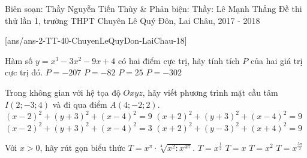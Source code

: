 \begin{name}
{Biên soạn: Thầy Nguyễn Tiến Thùy \& Phản biện: Thầy: Lê Mạnh Thắng}
{Đề thi thử lần 1, trường THPT Chuyên Lê Quý Đôn, Lai Châu, 2017 - 2018}
\end{name}
\setcounter{ex}{0}
[ans/ans-2-TT-40-ChuyenLeQuyDon-LaiChau-18]

\begin{ex}%
Hàm số $y=x^3-3x^2-9x+4$ có hai điểm cực trị, hãy tính tích $P$ của hai giá trị cực trị đó.
\choice
{\True $P=-207$}
{$P=-82$}
{$P=25$}
{$P=-302$}
\end{ex}

\begin{ex}%
Trong không gian với hệ tọa độ $Oxyz$, hãy viết phương trình mặt cầu tâm $I(2;-3;4)$ và đi qua điểm $A(4;-2;2)$.
\choice
{\True $(x-2)^2+(y+3)^2+(x-4)^2=9$}
{$(x+2)^2+(y+3)^2+(x-4)^2=9$}
{$(x-2)^2+(y+3)^2+(x-4)^2=3$}
{$(x+2)^2+(y-3)^2+(x+4)^2=9$}
\end{ex}

\begin{ex}%
Với $x>0$, hãy rút gọn biểu thức $T=x^{\pi}\cdot\sqrt[4]{x^2:x^{4\pi}}$.
\choice
{\True $T=x^{\frac{1}{2}}$}
{$T=x$}
{$T=x^2$}
{$T=x^{\frac{5\pi}{2}}$}
\end{ex}

